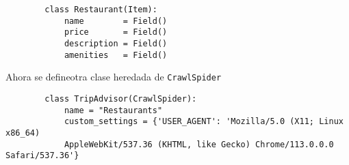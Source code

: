         \begin{verbatim}
        class Restaurant(Item):
            name        = Field()
            price       = Field()
            description = Field()
            amenities   = Field()
        \end{verbatim}

        Ahora se defineotra clase heredada de \texttt{CrawlSpider}

        \begin{verbatim}
        class TripAdvisor(CrawlSpider):
            name = "Restaurants"
            custom_settings = {'USER_AGENT': 'Mozilla/5.0 (X11; Linux x86_64) 
            AppleWebKit/537.36 (KHTML, like Gecko) Chrome/113.0.0.0 Safari/537.36'}
        \end{verbatim}